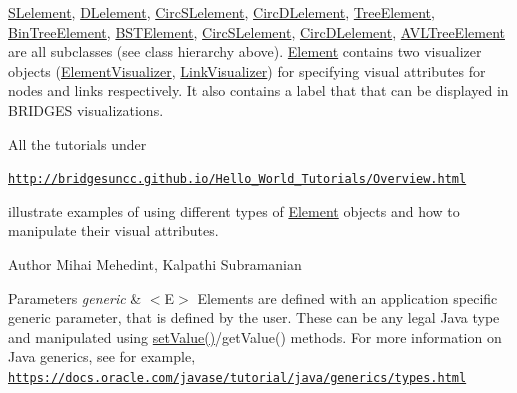 \mbox{\hyperlink{classbridges_1_1base_1_1_s_lelement}{S\+Lelement}}, \mbox{\hyperlink{classbridges_1_1base_1_1_d_lelement}{D\+Lelement}}, \mbox{\hyperlink{classbridges_1_1base_1_1_circ_s_lelement}{Circ\+S\+Lelement}}, \mbox{\hyperlink{classbridges_1_1base_1_1_circ_d_lelement}{Circ\+D\+Lelement}}, \mbox{\hyperlink{classbridges_1_1base_1_1_tree_element}{Tree\+Element}}, \mbox{\hyperlink{classbridges_1_1base_1_1_bin_tree_element}{Bin\+Tree\+Element}}, \mbox{\hyperlink{classbridges_1_1base_1_1_b_s_t_element}{B\+S\+T\+Element}}, \mbox{\hyperlink{classbridges_1_1base_1_1_circ_s_lelement}{Circ\+S\+Lelement}}, \mbox{\hyperlink{classbridges_1_1base_1_1_circ_d_lelement}{Circ\+D\+Lelement}}, \mbox{\hyperlink{classbridges_1_1base_1_1_a_v_l_tree_element}{A\+V\+L\+Tree\+Element}} are all subclasses (see class hierarchy above). \mbox{\hyperlink{classbridges_1_1base_1_1_element}{Element}} contains two visualizer objects (\mbox{\hyperlink{classbridges_1_1base_1_1_element_visualizer}{Element\+Visualizer}}, \mbox{\hyperlink{classbridges_1_1base_1_1_link_visualizer}{Link\+Visualizer}}) for specifying visual attributes for nodes and links respectively. It also contains a label that that can be displayed in B\+R\+I\+D\+G\+ES visualizations.

All the tutorials under

\href{http://bridgesuncc.github.io/Hello_World_Tutorials/Overview.html}{\tt http\+://bridgesuncc.\+github.\+io/\+Hello\+\_\+\+World\+\_\+\+Tutorials/\+Overview.\+html}

illustrate examples of using different types of \mbox{\hyperlink{classbridges_1_1base_1_1_element}{Element}} objects and how to manipulate their visual attributes.

\begin{DoxyAuthor}{Author}
Mihai Mehedint, Kalpathi Subramanian
\end{DoxyAuthor}

\begin{DoxyParams}{Parameters}
{\em generic} & $<$\+E$>$ Elements are defined with an application specific generic parameter, that is defined by the user. These can be any legal Java type and manipulated using \mbox{\hyperlink{classbridges_1_1base_1_1_element_ab3cf1241da0bc4c59cea9d6f0fd7aaf4}{set\+Value()}}/get\+Value() methods. For more information on Java generics, see for example, \href{https://docs.oracle.com/javase/tutorial/java/generics/types.html}{\tt https\+://docs.\+oracle.\+com/javase/tutorial/java/generics/types.\+html} \\
\hline
\end{DoxyParams}


